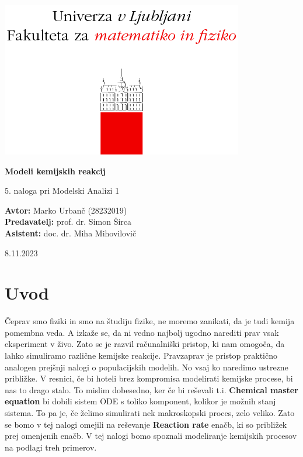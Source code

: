 \documentclass[a4paper]{article}
\begin{document}
\begin{titlepage}
    \begin{center}
        \includegraphics[]{logo.png}
        \vspace*{3cm}
        
        \Huge
        \textbf{Modeli kemijskih reakcij}
        
        \vspace{0.5cm}
        \large
        5. naloga pri Modelski Analizi 1

        \vspace{4.5cm}
        
        \textbf{Avtor:} Marko Urbanč (28232019)\ \\
        \textbf{Predavatelj:} prof. dr. Simon Širca\ \\
        \textbf{Asistent:} doc. dr. Miha Mihovilovič\ \\
        
        \vspace{2.8cm}
        
        \large
        8.11.2023
    \end{center}
\end{titlepage}
\tableofcontents
\newpage
\section{Uvod}
Čeprav smo fiziki in smo na študiju fizike, ne moremo zanikati, da je tudi kemija pomembna veda. A izkaže se, da 
ni vedno najbolj ugodno narediti prav vsak eksperiment v živo. Zato se je razvil računalniški pristop,
ki nam omogoča, da lahko simuliramo različne kemijske reakcije. Pravzaprav je pristop praktično analogen
prejšnji nalogi o populacijskih modelih. No vsaj ko naredimo ustrezne približke. V resnici, če bi hoteli brez kompromisa
modelirati kemijske procese, bi nas to drago stalo. To mislim dobesedno, ker če bi reševali t.i. \textbf{Chemical master
equation} bi dobili sistem ODE s toliko komponent, kolikor je možnih stanj sistema. To pa je, če želimo simulirati nek
makroskopski proces, zelo veliko. Zato se bomo v tej nalogi omejili na reševanje \textbf{Reaction rate} enačb, ki so
približek prej omenjenih enačb. V tej nalogi bomo spoznali modeliranje kemijskih procesov na podlagi treh primerov.\\
\end{document}

